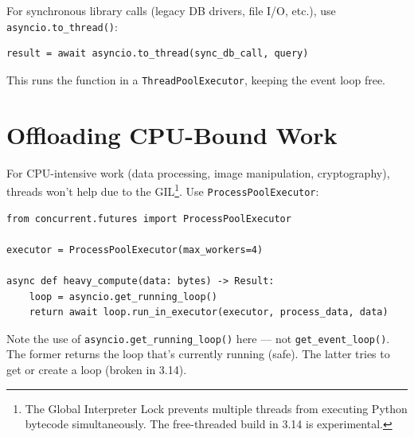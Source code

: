 \documentclass[11pt,a4paper,oneside]{book}
\newcommand{\py}[1]{\texttt{\color{pyblue}#1}}
\begin{document}
For synchronous library calls (legacy DB drivers, file I/O, etc.), use \py{asyncio.to\_thread()}:

\begin{lstlisting}[style=python]
result = await asyncio.to_thread(sync_db_call, query)
\end{lstlisting}

This runs the function in a \py{ThreadPoolExecutor}, keeping the event loop free.

\section{Offloading CPU-Bound Work}

For CPU-intensive work (data processing, image manipulation, cryptography), threads won't help
due to the GIL\footnote{The Global Interpreter Lock prevents multiple threads from executing
Python bytecode simultaneously. The free-threaded build in 3.14 is experimental.}. Use
\py{ProcessPoolExecutor}:

\begin{lstlisting}[style=python]
from concurrent.futures import ProcessPoolExecutor

executor = ProcessPoolExecutor(max_workers=4)

async def heavy_compute(data: bytes) -> Result:
    loop = asyncio.get_running_loop()
    return await loop.run_in_executor(executor, process_data, data)
\end{lstlisting}

\begin{warningbox}
Note the use of \py{asyncio.get\_running\_loop()} here --- not \py{get\_event\_loop()}.
The former returns the loop that's currently running (safe). The latter tries to get or
create a loop (broken in 3.14).
\end{warningbox}
\end{document}
